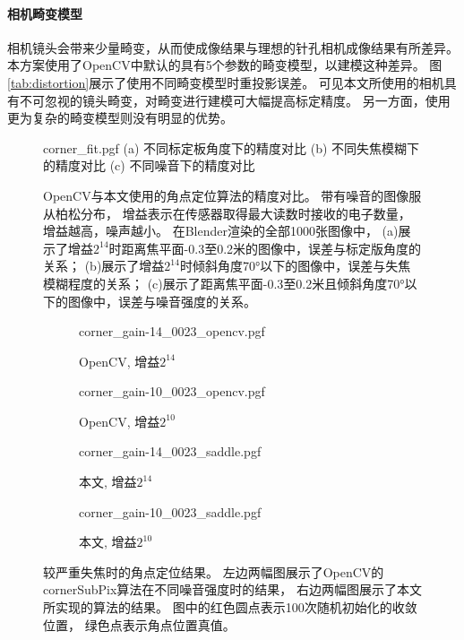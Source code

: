 \paragraph{相机畸变模型}
相机镜头会带来少量畸变，从而使成像结果与理想的针孔相机成像结果有所差异。
本方案使用了OpenCV中默认的具有5个参数的畸变模型，以建模这种差异。
图\ref{tab:distortion}展示了使用不同畸变模型时重投影误差。
可见本文所使用的相机具有不可忽视的镜头畸变，对畸变进行建模可大幅提高标定精度。
另一方面，使用更为复杂的畸变模型则没有明显的优势。

\begin{figure}
    \centering
    {corner_fit.pgf}
    \small
    (a) 不同标定板角度下的精度对比\hfill
    (b) 不同失焦模糊下的精度对比\hfill
    (c) 不同噪音下的精度对比
    \caption[OpenCV与本文使用的角点定位算法的精度对比]{
        OpenCV与本文使用的角点定位算法的精度对比。
        带有噪音的图像服从柏松分布，
        增益表示在传感器取得最大读数时接收的电子数量，增益越高，噪声越小。
        在Blender渲染的全部1000张图像中，
        (a)展示了增益$2^{14}$时距离焦平面-0.3至0.2米的图像中，误差与标定版角度的关系；
        (b)展示了增益$2^{14}$时倾斜角度70°以下的图像中，误差与失焦模糊程度的关系；
        (c)展示了距离焦平面-0.3至0.2米且倾斜角度70°以下的图像中，误差与噪音强度的关系。
    }
    \label{fig:corner_fit}
\end{figure}

\begin{figure}
    \centering
    \begin{subfigure}{1.57in}
        {corner_gain-14_0023_opencv.pgf}%
        \caption{OpenCV, 增益$2^{14}$}%
    \end{subfigure}%
    \begin{subfigure}{1.57in}
        {corner_gain-10_0023_opencv.pgf}%
        \caption{OpenCV, 增益$2^{10}$}%
    \end{subfigure}%
    \begin{subfigure}{1.57in}
        {corner_gain-14_0023_saddle.pgf}%
        \caption{本文, 增益$2^{14}$}%
    \end{subfigure}%
    \begin{subfigure}{1.57in}
        {corner_gain-10_0023_saddle.pgf}%
        \caption{本文, 增益$2^{10}$}%
    \end{subfigure}%
    \caption[较严重失焦时的角点定位结果]{
        较严重失焦时的角点定位结果。
        左边两幅图展示了OpenCV的cornerSubPix算法在不同噪音强度时的结果，
        右边两幅图展示了本文所实现的算法的结果。
        图中的红色圆点表示100次随机初始化的收敛位置，
        绿色点表示角点位置真值。
    }
    \label{fig:corner_blur}
\end{figure}


